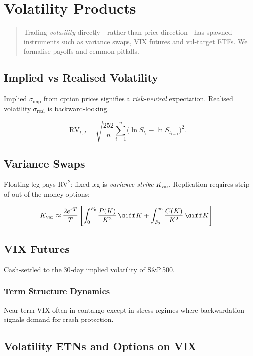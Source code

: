 \chapter{Volatility Products}\label{ch:volprods}

\begin{abstract}
Trading \emph{volatility} directly—rather than price direction—has spawned
instruments such as variance swaps, VIX futures and vol‑target ETFs.
We formalise payoffs and common pitfalls.
\end{abstract}

\section{Implied vs Realised Volatility}

Implied \(\sigma_{\text{imp}}\) from option prices signifies a \emph{risk‑neutral}
expectation.  Realised volatility \(\sigma_{\text{real}}\) is backward‑looking.

\[%
\text{RV}_{t,T} = \sqrt{\frac{252}{n}\sum_{i=1}^{n}\bigl(\ln S_{t_i} - \ln S_{t_{i-1}}\bigr)^2 }.
\]

\section{Variance Swaps}

Floating leg pays \(\text{RV}^2\); fixed leg is
\emph{variance strike} \(K_{\text{var}}\).
Replication requires strip of out‑of‑the‑money options:

\[
K_{\text{var}} \approx \frac{2e^{rT}}{T}
        \left[ \int_0^{F_0} \frac{P(K)}{K^2}\,\diff K
             + \int_{F_0}^{\infty} \frac{C(K)}{K^2}\,\diff K \right].
\]

\section{VIX Futures}

Cash‑settled to the 30‑day implied volatility of S\&P 500.

\subsection{Term Structure Dynamics}

Near‑term VIX often in contango except in stress regimes
where backwardation signals demand for crash protection.

\section{Volatility ETNs and Options on VIX}

